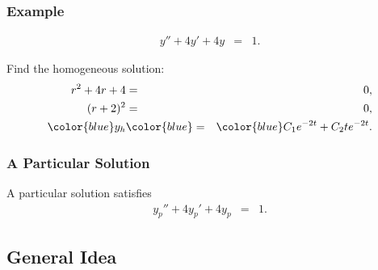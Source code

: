 \begin{frame}
  \frametitle{Example}

  \begin{eqnarray*}
    y'' + 4y' + 4y & = & 1.
  \end{eqnarray*}

  {
    Find the homogeneous solution:
      \begin{eqnarray*}
        r^2 + 4r + 4 & = & 0, \\
        (r+2)^2 & = & 0, \\
        {\color{blue}y_h} & {\color{blue}=} & {\color{blue}C_1 e^{-2t} + C_2 t e^{-2t}}.
      \end{eqnarray*}
    }

\end{frame}


\begin{frame}
  \frametitle{A Particular Solution}

  A particular solution satisfies
  \begin{eqnarray*}
    y_p'' + 4y_p' + 4y_p & = & 1.
  \end{eqnarray*}

  


\end{frame}

\subsection{General Idea}

